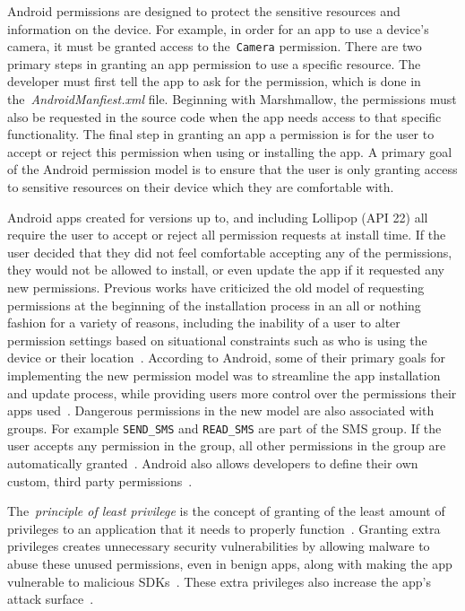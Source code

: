 \documentclass{sig-alternate-05-2015}
\begin{document}
Android permissions are designed to protect the sensitive resources and information on the device. For example, in order for an app to use a device's camera, it must be granted access to the~\texttt{Camera} permission. There are two primary steps in granting an app permission to use a specific resource. The developer must first tell the app to ask for the permission, which is done in the~\emph{AndroidManfiest.xml} file. Beginning with Marshmallow, the permissions must also be requested in the source code when the app needs access to that specific functionality. The final step in granting an app a permission is for the user to accept or reject this permission when using or installing the app. A primary goal of the Android permission model is to ensure that the user is only granting access to sensitive resources on their device which they are comfortable with.

Android apps created for versions up to, and including Lollipop (API 22) all require the user to accept or reject all permission requests at install time. If the user decided that they did not feel comfortable accepting any of the permissions, they would not be allowed to install, or even update the app if it requested any new permissions. Previous works have criticized the old model of requesting permissions at the beginning of the installation process in an all or nothing fashion for a variety of reasons, including the inability of a user to alter permission settings based on situational constraints such as who is using the device or their location~\cite{Nauman:2010:AEA:1755688.1755732,Conti:2010:CCP:1949317.1949355}. According to Android, some of their primary goals for implementing the new permission model was to streamline the app installation and update process, while providing users more control over the permissions their apps used~\cite{android_developer_URL}. Dangerous permissions in the new model are also associated with groups. For example \texttt{SEND\_SMS} and \texttt{READ\_SMS} are part of the SMS group. If the user accepts any permission in the group, all other permissions in the group are automatically granted~\cite{AndroidSystemPermissions_URL}. Android also allows developers to define their own custom, third party permissions~\cite{Android_Permission_Groups_URL, Android_Permissions_Defined_URL}.

The~\emph{principle of least privilege} is the concept of granting of the least amount of privileges to an application that it needs to properly function~\cite{saltzer1975protection}. Granting extra privileges creates unnecessary security vulnerabilities by allowing malware to abuse these unused permissions, even in benign apps, along with making the app vulnerable to malicious SDKs~\cite{6614340}. These extra privileges also increase the app's attack surface~\cite{Davi:2010:PEA:1949317.1949356, Bartel:2012:ASP:2351676.2351722}.
\end{document}
